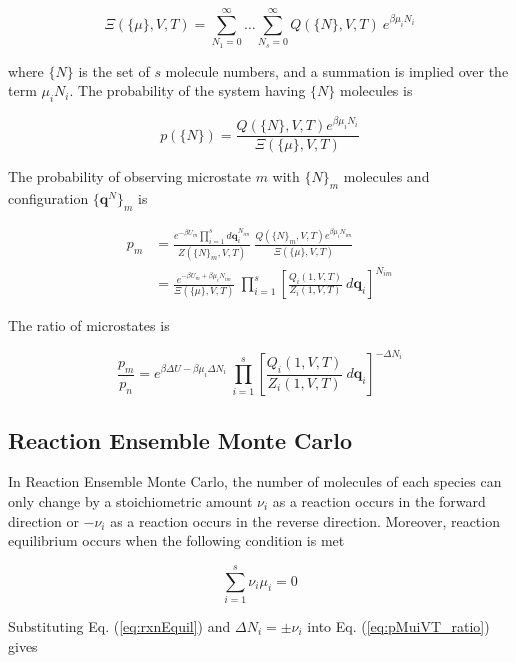 \begin{equation}
\label{eq:partitionFn_MuiVT}
\Xi(\{\mu\},V,T) = \sum\limits_{N_1=0}^{\infty} \ldots \sum\limits_{N_s=0}^{\infty}Q(\{N\},V,T)\ e^{\beta \mu_i N_i}
\end{equation}

where $\{N\}$ is the set of $s$ molecule numbers, and a summation is implied over the term $\mu_i N_i$. The probability of the system having $\{N\}$ molecules is 

\begin{equation}
\label{eq:pNi}
p(\{N\}) = \frac{Q(\{N\},V,T)e^{\beta \mu_i N_i}}{\Xi(\{\mu\},V,T)}
\end{equation}

The probability of observing microstate $m$ with $\{N\}_m$ molecules and configuration $\{\mathbf{q}^N\}_m$ is

\begin{align}
\label{eq:pMuiVT}
p_m &= \frac{e^{-\beta U_m} \prod\limits_{i=1}^s{d\mathbf{q}_i^{N_{im}}}}{Z(\{N\}_m,V,T)}\ \frac{Q(\{N\}_m,V,T)e^{\beta \mu_i N_{im}}}{\Xi(\{\mu\},V,T)} \nonumber \\
&= \frac{e^{-\beta U_m + \beta \mu_i N_{im}}}{\Xi(\{\mu\},V,T)}\ \prod\limits_{i=1}^s\left[\frac{Q_i(1,V,T)}{Z_i(1,V,T)}\ d\mathbf{q}_i\right]^{N_{im}}
\end{align}

The ratio of microstates is 

\begin{equation}
\label{eq:pMuiVT_ratio}
\frac{p_m}{p_n} = e^{\beta \Delta U - \beta \mu_i \Delta N_i}\ \prod\limits_{i=1}^s\left[\frac{Q_i(1,V,T)}{Z_i(1,V,T)}\ d\mathbf{q}_i\right]^{-\Delta N_i}
\end{equation}

\subsection{Reaction Ensemble Monte Carlo}
\label{sec:rxmc}
In Reaction Ensemble Monte Carlo, the number of molecules of each species can only change by a stoichiometric amount $\nu_i$ as a reaction occurs in the forward direction or $-\nu_i$ as a reaction occurs in the reverse direction. Moreover, reaction equilibrium occurs when the following condition is met

\begin{equation}
\label{eq:rxnEquil}
\sum\limits_{i=1}^{s}{\nu_i \mu_i} = 0
\end{equation}

Substituting Eq. (\ref{eq:rxnEquil}) and $\Delta N_i = \pm \nu_i$ into Eq. (\ref{eq:pMuiVT_ratio}) gives

